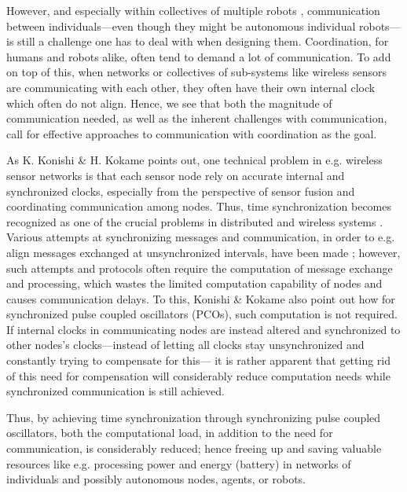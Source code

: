 However, and especially within collectives of multiple robots \cite{cocoro, swarm_bot}, communication between individuals—even though they might be autonomous individual robots—is still a challenge one has to deal with when designing them. Coordination, for humans and robots alike, often tend to demand a lot of communication. To add on top of this, when networks or collectives of sub-systems like wireless sensors are communicating with each other, they often have their own internal clock which often do not align. Hence, we see that both the magnitude of communication needed, as well as the inherent challenges with communication, call for effective approaches to communication with coordination as the goal.

As K. Konishi \& H. Kokame \cite{konishi_kokame} points out, one technical problem in e.g. wireless sensor networks is that each sensor node rely on accurate internal and synchronized clocks, especially from the perspective of sensor fusion and coordinating communication among nodes. Thus, time synchronization becomes recognized as one of the crucial problems in distributed and wireless systems \cite{tungvinte_sync_protocols}. Various attempts at synchronizing messages and communication, in order to e.g. align messages exchanged at unsynchronized intervals, have been made \cite{tungvinte_sync_protocols}; however, such attempts and protocols often require the computation of message exchange and processing, which wastes the limited computation capability of nodes and causes communication delays. To this, Konishi \& Kokame \cite{konishi_kokame} also point out how for synchronized pulse coupled oscillators (PCOs), such computation is not required. If internal clocks in communicating nodes are instead altered and synchronized to other nodes's clocks—instead of letting all clocks stay unsynchronized and constantly trying to compensate for this— it is rather apparent that getting rid of this need for compensation will considerably reduce computation needs while synchronized communication is still achieved.

Thus, by achieving time synchronization \cite{tungvinte_sync_protocols} through synchronizing pulse coupled oscillators, both the computational load, in addition to the need for communication, is considerably reduced; hence freeing up and saving valuable resources like e.g. processing power and energy (battery) in networks of individuals and possibly autonomous nodes, agents, or robots.



